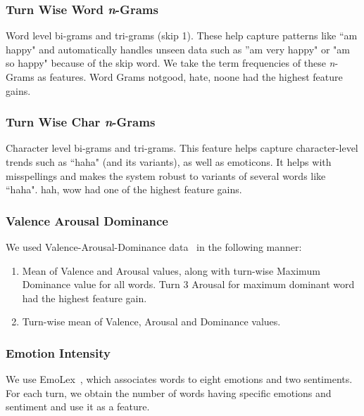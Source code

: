 \documentclass[11pt,a4paper]{article}
\begin{document}
\subsubsection{Turn Wise Word \textit{n}-Grams} \label{turnwisewordgram}
Word level bi-grams and tri-grams (skip 1). These help capture patterns like ``am happy" and automatically handles unseen data such as ''am very happy" or "am so happy" because of the skip word. We take the term frequencies of these \textit{n}-Grams as features. Word Grams notgood, hate, noone had the highest feature gains.

\subsubsection{Turn Wise Char \textit{n}-Grams} \label{turnwisechargram}
Character level bi-grams and tri-grams. This feature helps capture character-level trends such as ``haha" (and its variants), as well as emoticons. It helps with misspellings and makes the system robust to variants of several words like ``haha". hah, wow had one of the highest feature gains.

\subsubsection{Valence Arousal Dominance} \label{valencearousal}
We used Valence-Arousal-Dominance data~\cite{mohammad2018obtaining} in the following manner:
\begin{enumerate}
    \item Mean of Valence and Arousal values, along with turn-wise Maximum Dominance value for all words. Turn 3 Arousal for maximum dominant word had the highest feature gain.
    \item Turn-wise mean of Valence, Arousal and Dominance values.
\end{enumerate}

\subsubsection{Emotion Intensity}\label{emotionintensity}
We use EmoLex~\cite{Mohammad2010EmotionsEB}, which associates words to eight emotions and two sentiments. For each turn, we obtain the number of words having specific emotions and sentiment and use it as a feature.
\end{document}
